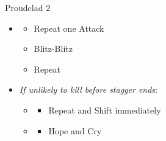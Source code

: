 \begin{paracol}{2}
\begin{battle}{Proudclad 2}
\begin{itemize}
\begin{itemize}
		      \end{itemize}
		\item \second
		      \begin{itemize}
			      \item Repeat one Attack
			      \item Blitz-Blitz
			      \item Repeat
		      \end{itemize}
		\item \textit{If unlikely to kill before stagger ends}:
		      \begin{itemize}
			      \item \first
			            \begin{itemize}
				            \item Repeat and Shift immediately
			            \end{itemize}
			      \item \second
			            \begin{itemize}
				            \item Hope and Cry
			            \end{itemize}
		      \end{itemize}
	\end{itemize}
\end{battle}
\switchcolumn*
{}
\switchcolumn
{}
\end{paracol}